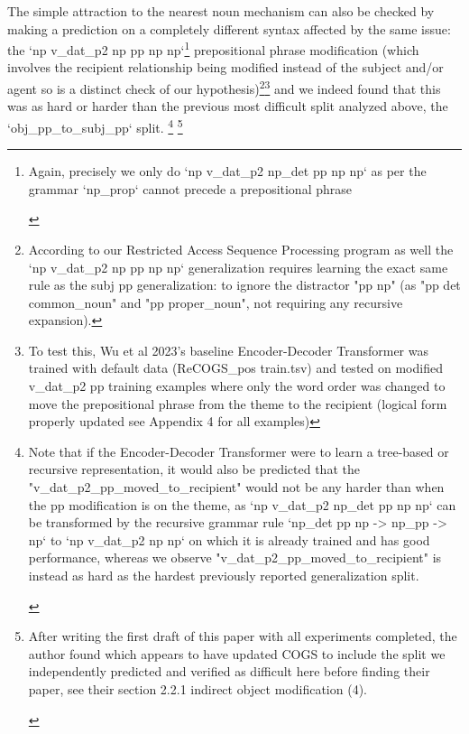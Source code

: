 \documentclass[11pt]{article}
\begin{document}
The simple attraction to the nearest noun mechanism can also be checked by making a prediction on a completely different syntax affected by the same issue: the `np v\_dat\_p2 np pp np np`\footnote{
\begin{tiny}
Again, precisely we only do `np v\_dat\_p2 np\_det pp np np` as per the grammar `np\_prop` cannot precede a prepositional phrase
\end{tiny}
} prepositional phrase modification (which involves the recipient relationship being modified instead of the subject and/or agent so is a distinct check of our hypothesis)\footnote{According to our Restricted Access Sequence Processing program as well the `np v\_dat\_p2 np pp np np` generalization requires learning the exact same rule as the subj pp generalization: to ignore the distractor "pp np" (as "pp det common\_noun" and "pp proper\_noun", not requiring any recursive expansion).}\footnote{To test this, Wu et al 2023's baseline Encoder-Decoder Transformer was trained with default data (ReCOGS\_pos train.tsv) and tested on modified v\_dat\_p2 pp training examples where only the word order was changed to move the prepositional phrase from the theme to the recipient (logical form properly updated see Appendix 4 for all examples)} and we indeed found that this was as hard or harder than the previous most difficult split analyzed above, the `obj\_pp\_to\_subj\_pp` split.
\footnote{
\begin{tiny}
Note that if the Encoder-Decoder Transformer were to learn a tree-based or recursive representation, it would also be predicted that the "v\_dat\_p2\_pp\_moved\_to\_recipient" would not be any harder than when the pp modification is on the theme, as `np v\_dat\_p2 np\_det pp np np` can be transformed by the recursive grammar rule `np\_det pp np -> np\_pp -> np` to `np v\_dat\_p2 np np` on which it is already trained and has good performance, whereas we observe "v\_dat\_p2\_pp\_moved\_to\_recipient" is instead as hard as the hardest previously reported generalization split.
\end{tiny}
}
\footnote{
\begin{tiny}
After writing the first draft of this paper with all experiments completed, the author found \cite{li2023slogstructuralgeneralizationbenchmark} which appears to have updated COGS to include the split we independently predicted and verified as difficult here before finding their paper, see their section 2.2.1 indirect object modification (4).
\end{tiny}
}
\end{document}
